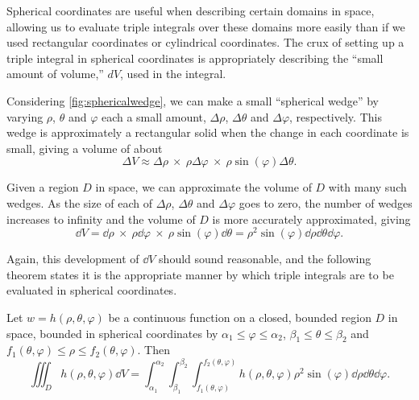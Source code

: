 Spherical coordinates are useful when describing certain domains in space, allowing us to evaluate triple integrals over these domains more easily than if we used rectangular coordinates or cylindrical coordinates. The crux of setting up a triple integral in spherical coordinates is appropriately describing the ``small amount of volume,'' $dV$, used in the integral.


Considering \autoref{fig:sphericalwedge}, we can make a small ``spherical wedge'' by varying $\rho$, $\theta$ and $\varphi$ each a small amount, $\Delta\rho$, $\Delta\theta$ and $\Delta\varphi$, respectively. This wedge is approximately a rectangular solid when the change in each coordinate is small, giving a volume of about
\[
\Delta V \approx \Delta\rho\ \times\ \rho\Delta\varphi\ \times\ \rho\sin(\varphi)\Delta\theta.
\]

Given a region $D$ in space, we can approximate the volume of $D$ with many such wedges. As the size of each of $\Delta\rho$, $\Delta\theta$ and $\Delta\varphi$ goes to zero, the number of wedges increases to infinity and the volume of $D$ is more accurately approximated, giving
\[
\dd V = \dd\rho\ \times\ \rho\dd\varphi\ \times\ \rho\sin(\varphi)\dd\theta
=\rho^2\sin(\varphi)\dd\rho\dd\theta\dd\varphi.
\]

Again, this development of $\dd V$ should sound reasonable, and the following theorem states it is the appropriate manner by which triple integrals are to be evaluated in spherical coordinates.


\begin{theorem}\label{thm:triple_int_spherical}
Let $w=h(\rho,\theta,\varphi)$ be a continuous function on a closed, bounded region $D$ in space, bounded in spherical coordinates by $\alpha_1 \leq \varphi \leq \alpha_2$, $\beta_1 \leq \theta \leq \beta_2$ and $f_1(\theta,\varphi) \leq \rho \leq f_2(\theta,\varphi)$. Then 
\[
\iiint_D h(\rho,\theta,\varphi)\dd V = \int_{\alpha_1}^{\alpha_2}\int_{\beta_1}^{\beta_2}\int_{f_1(\theta,\varphi)}^{f_2(\theta,\varphi)} h(\rho,\theta,\varphi) \rho^2\sin(\varphi)\dd\rho\dd\theta\dd\varphi.
\]
\end{theorem}

